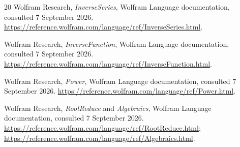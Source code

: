 \documentclass[11pt,a4paper]{article}
\numberwithin{equation}{section}
\theoremstyle{definition}
\theoremstyle{remark}
\begin{document}
\begin{thebibliography}{20}
Wolfram Research, \emph{InverseSeries}, Wolfram Language documentation,
consulted 7 September 2026.
\url{https://reference.wolfram.com/language/ref/InverseSeries.html}.

Wolfram Research, \emph{InverseFunction}, Wolfram Language documentation,
consulted 7 September 2026.
\url{https://reference.wolfram.com/language/ref/InverseFunction.html}.

Wolfram Research, \emph{Power}, Wolfram Language documentation,
consulted 7 September 2026.
\url{https://reference.wolfram.com/language/ref/Power.html}.

Wolfram Research, \emph{RootReduce} and \emph{Algebraics}, Wolfram Language
documentation, consulted 7 September 2026.
\url{https://reference.wolfram.com/language/ref/RootReduce.html};
\url{https://reference.wolfram.com/language/ref/Algebraics.html}.
\end{thebibliography}
\endgroup
\end{document}

